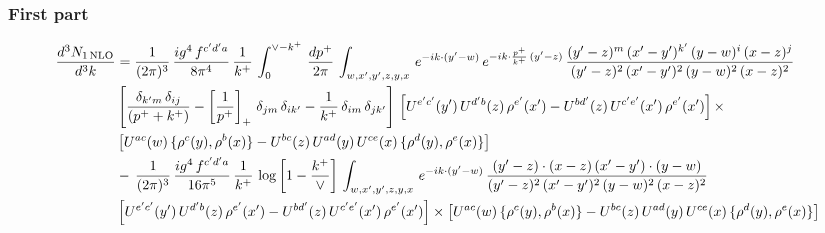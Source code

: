 \documentclass[9pt]{article}
\numberwithin{equation}{section}
\begin{document}
 \subsubsection{First part}
 \begin{align}
     \frac{d^{3}N_{1\,\rm NLO}}{d^{3}k} & = \frac{1}{(2\pi)^{3}}\, \frac{ig^{4}\,f^{c'd'a}}{8\pi^{4}}\, \frac{1}{k^{+}}\,\int_{0}^{\vee-k^{+}}\,  \frac{dp^{+}}{2\pi}\, \int_{w,x',y',z,y,x}\, e^{-ik\cdot (y'-w)}\, e^{-ik\cdot \frac{p^{+}}{k^{+}}\,(y'-z)}\,\frac{(y'-z)^{m}\,(x'-y')^{k'}\,(y-w)^{i}\,(x-z)^{j}}{(y'-z)^{2}\,(x'-y')^{2}\,(y-w)^{2}\,(x-z)^{2}}\notag \\ & \left[\frac{\delta_{k'm}\,\delta_{ij}}{(p^{+}+k^{+})}-\left[\frac{1}{p^{+}}\right]_{+}\,\delta_{jm}\,\delta_{ik'}-\frac{1}{k^{+}}\, \delta_{im}\, \delta_{jk'}\right]\, \left[U^{e'c'}(y')\,U^{d'b}(z)\,\rho^{e'}(x')-U^{bd'}(z)\,U^{c'e'}(x')\,\rho^{e'}(x')\right]\times\notag \\ &  \left[U^{ac}(w)\, \{\rho^{c}(y),\rho^{b}(x)\}-U^{bc}(z)\,U^{ad}(y)\,U^{ce}(x)\,\{\rho^{d}(y),\rho^{e}(x)\}\right]\notag \\ & -\,\frac{1}{(2\pi)^{3}}\, \frac{ig^{4}\,f^{c'd'a}}{16\pi^{5}}\, \frac{1}{k^{+}}\, \log{\left[1-\frac{k^{+}}{\vee}\right]}\, \int_{w,x',y',z,y,x}\, e^{-ik\cdot (y'-w)}\,\frac{(y'-z)\cdot (x-z)\,(x'-y')\cdot (y-w)}{(y'-z)^{2}\,(x'-y')^{2}\,(y-w)^{2}\,(x-z)^{2}}\notag \\ &  \left[U^{e'c'}(y')\,U^{d'b}(z)\,\rho^{e'}(x')-U^{bd'}(z)\,U^{c'e'}(x')\,\rho^{e'}(x')\right]\times  \left[U^{ac}(w)\, \{\rho^{c}(y),\rho^{b}(x)\}-U^{bc}(z)\,U^{ad}(y)\,U^{ce}(x)\,\{\rho^{d}(y),\rho^{e}(x)\}\right]
\end{align} 
\end{document}
